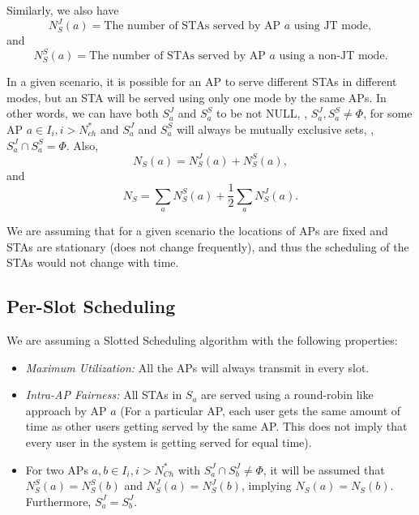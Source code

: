 Similarly, we also have
\begin{equation*}
    N_S^J(a) = \text{The number of STAs served by AP } a \text{ using JT mode},
\end{equation*}
and
\begin{equation*}
    N_S^S(a) = \text{The number of STAs served by AP } a \text{ using a non-JT mode}.
\end{equation*}

In a given scenario, it is possible for an AP to serve different STAs in different modes, but an STA will be served using only one mode by the same APs.
In other words, we can have both $S_a^J$ and $S_a^S$ to be not NULL, \ie, $S_a^J, S_a^S \neq \Phi$, for some AP $a \in I_i, i > N_{ch}^*$ and $S_a^J$ and $S_a^S$ will always be mutually exclusive sets, \ie , $S_a^J\cap S_a^S = \Phi$. Also,
\begin{equation}
    N_S(a) = N_S^J(a) + N_S^S(a),
\end{equation}
and
\begin{equation}
    \label{eq:STAsumInDifferentModes}
    N_S = \sum_a N_S^S(a) + \frac{1}{2} \sum_a N_S^J(a).
\end{equation}

We are assuming that for a given scenario the locations of APs are fixed and STAs are stationary (does not change frequently), and thus the scheduling of the STAs would not change with time.

\subsection{Per-Slot Scheduling}
\label{subsec:perSlotScheduling}
We are assuming a Slotted Scheduling algorithm with the following properties:
\begin{itemize}
    \item \textit{Maximum Utilization:} All the APs will always transmit in every slot.
    
    \item \textit{Intra-AP Fairness:} All STAs in $S_a$ are served using a round-robin like approach by AP $a$ (For a particular AP, each user gets the same amount of time as other users getting served by the same AP. This does not imply that every user in the system is getting served for equal time).
    
    \item For two APs $a, b \in I_i, i > N_{Ch}^*$ with $S_a^J \cap S_b^J \neq \Phi$, it will be assumed that $N_S^S(a) = N_S^S(b)$ and $N_S^J(a) = N_S^J(b)$, implying $N_S(a) = N_S(b)$. Furthermore, $S_a^J = S_b^J$.
    
\end{itemize} 

